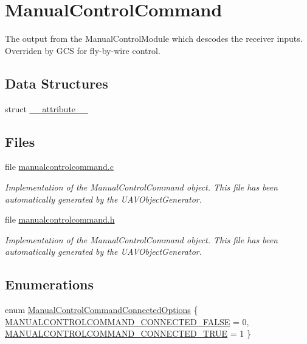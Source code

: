 \hypertarget{group___manual_control_command}{\section{\-Manual\-Control\-Command}
\label{group___manual_control_command}
}


\-The output from the \-Manual\-Control\-Module which descodes the receiver inputs. \-Overriden by \-G\-C\-S for fly-\/by-\/wire control.  


\subsection*{\-Data \-Structures}
\begin{DoxyCompactItemize}
\item 
struct \hyperlink{struct____attribute____}{\-\_\-\-\_\-attribute\-\_\-\-\_\-}
\end{DoxyCompactItemize}
\subsection*{\-Files}
\begin{DoxyCompactItemize}
\item 
file \hyperlink{manualcontrolcommand_8c}{manualcontrolcommand.\-c}
\begin{DoxyCompactList}\small\item\em \-Implementation of the \-Manual\-Control\-Command object. \-This file has been automatically generated by the \-U\-A\-V\-Object\-Generator. \end{DoxyCompactList}\item 
file \hyperlink{manualcontrolcommand_8h}{manualcontrolcommand.\-h}
\begin{DoxyCompactList}\small\item\em \-Implementation of the \-Manual\-Control\-Command object. \-This file has been automatically generated by the \-U\-A\-V\-Object\-Generator. \end{DoxyCompactList}\end{DoxyCompactItemize}
\subsection*{\-Enumerations}
\begin{DoxyCompactItemize}
\item 
enum \hyperlink{group___manual_control_command_ga69571c80f9e4f3fc492d2a4ac9b428c3}{\-Manual\-Control\-Command\-Connected\-Options} \{ \hyperlink{group___manual_control_command_gga69571c80f9e4f3fc492d2a4ac9b428c3a45e5c1a25669d95137c32693743cc878}{\-M\-A\-N\-U\-A\-L\-C\-O\-N\-T\-R\-O\-L\-C\-O\-M\-M\-A\-N\-D\-\_\-\-C\-O\-N\-N\-E\-C\-T\-E\-D\-\_\-\-F\-A\-L\-S\-E} = 0, 
\hyperlink{group___manual_control_command_gga69571c80f9e4f3fc492d2a4ac9b428c3ab3e0febf59ee449b8f4da19754e5c309}{\-M\-A\-N\-U\-A\-L\-C\-O\-N\-T\-R\-O\-L\-C\-O\-M\-M\-A\-N\-D\-\_\-\-C\-O\-N\-N\-E\-C\-T\-E\-D\-\_\-\-T\-R\-U\-E} = 1
 \}
\end{DoxyCompactItemize}
